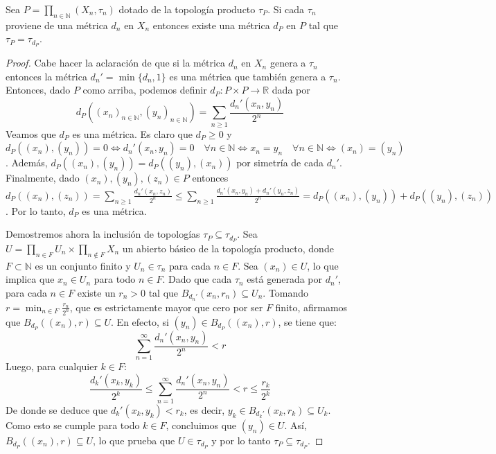 \documentclass{article}
\theoremstyle{plain}
\theoremstyle{definition}
\newcommand{\R}{\mathbb{R}}
\newcommand{\N}{\mathbb{N}}
\newenvironment{ejercicio}[1]{\begin{trivlist}
\item[\hskip \labelsep {\bfseries Ejercicio}\hskip \labelsep {\bfseries #1.}]}{\end{trivlist}}
\begin{document}
\begin{ejercicio}{4}
    Sea \( P = \prod_{n \in \N} (X_n, \tau_n) \) dotado de la topología producto \( \tau_P \). Si cada \( \tau_n \) proviene de una métrica \( d_n \) en \( X_n \) entonces existe una métrica \( d_P \) en \( P \) tal que \( \tau_P = \tau_{d_P} \).
\end{ejercicio}
\begin{proof}
    Cabe hacer la aclaración de que si la métrica \( d_n \) en \( X_n \) genera a \( \tau_n \) entonces la métrica \( d_n' = \min \{ d_n, 1 \} \) es una métrica que también genera a \( \tau_n \).
    Entonces, dado \( P \) como arriba, podemos definir \( d_P : P \times P \to \R \) dada por \[
        d_P({(x_n)}_{n \in \N}, {(y_n)}_{n \in \N}) = \sum_{n \geq 1} \frac{d_n'(x_n, y_n)}{2^n}
    \]
    Veamos que \( d_P \) es una métrica. Es claro que \( d_P \geq 0 \) y \( d_P({(x_n)}, {(y_n)}) = 0 \iff d_n'(x_n, y_n) = 0 \quad \forall n \in \N \iff x_n = y_n \quad \forall n \in \N \iff {(x_n)} = {(y_n)} \). Además, \( d_P({(x_n)}, {(y_n)}) = d_P({(y_n)}, {(x_n)}) \) por simetría de cada \( d_n' \). Finalmente, dado \( {(x_n)}, {(y_n)}, {(z_n)} \in P \) entonces \( d_P({(x_n)}, {(z_n)}) = \sum_{n \geq 1} \frac{d_n'(x_n, z_n)}{2^n} \leq \sum_{n \geq 1} \frac{d_n'(x_n, y_n) + d_n'(y_n, z_n)}{2^n} = d_P({(x_n)}, {(y_n)}) + d_P({(y_n)}, {(z_n)}) \). Por lo tanto, \( d_P \) es una métrica.

    Demostremos ahora la inclusión de topologías \( \tau_P \subseteq \tau_{d_P} \). Sea \( U = \prod_{n \in F} U_n \times \prod_{n \notin F} X_n \) un abierto básico de la topología producto, donde \( F \subset \mathbb{N} \) es un conjunto finito y \( U_n \in \tau_n \) para cada \( n \in F \). Sea \( {(x_n)} \in U \), lo que implica que \( x_n \in U_n \) para todo \( n \in F \). Dado que cada \( \tau_n \) está generada por \( d_n' \), para cada \( n \in F \) existe un \( r_n > 0 \) tal que \( B_{d_n'}(x_n, r_n) \subseteq U_n \). Tomando \( r = \min_{n \in F} \frac{r_n}{2^n} \), que es estrictamente mayor que cero por ser \( F \) finito, afirmamos que \( B_{d_P}({(x_n)}, r) \subseteq U \). En efecto, si \( {(y_n)} \in B_{d_P}({(x_n)}, r) \), se tiene que:
    \[
        \sum_{n=1}^{\infty} \frac{d_n'(x_n, y_n)}{2^n} < r
    \]
    Luego, para cualquier \( k \in F \):
    \[
        \frac{d_k'(x_k, y_k)}{2^k} \leq \sum_{n=1}^{\infty} \frac{d_n'(x_n, y_n)}{2^n} < r \leq \frac{r_k}{2^k}
    \]
    De donde se deduce que \( d_k'(x_k, y_k) < r_k \), es decir, \( y_k \in B_{d_k'}(x_k, r_k) \subseteq U_k \). Como esto se cumple para todo \( k \in F \), concluimos que \( {(y_n)} \in U \). Así, \( B_{d_P}({(x_n)}, r) \subseteq U \), lo que prueba que \( U \in \tau_{d_P} \) y por lo tanto \( \tau_P \subseteq \tau_{d_P} \).


\end{proof}
\end{document}

